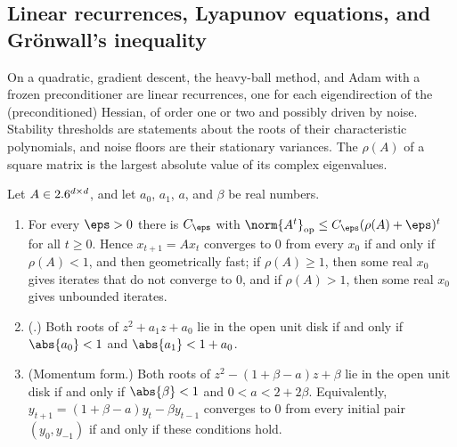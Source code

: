 \begin{refsection}
\section{Linear recurrences, Lyapunov equations, and Gr\"onwall's inequality}\label{sec:toolkit:recurrences}

On a quadratic, gradient descent, the heavy-ball method, and Adam with a frozen preconditioner are linear recurrences, one for each eigendirection of the (preconditioned) Hessian, of order one or two and possibly driven by noise. Stability thresholds are statements about the roots of their characteristic polynomials, and noise floors are their stationary variances. The  $\rho(A)$ of a square matrix is the largest absolute value of its complex eigenvalues.

\begin{lemma}\label{lem:toolkit:recurrence}
Let $A\in2.6^{d\times d}$, and let $a_0$, $a_1$, $a$, and $\beta$ be real numbers.
\begin{enumerate}
\item For every $\eps>0$ there is $C_\eps$ with $\norm{A^t}_{\op}\le C_\eps(\rho(A)+\eps)^t$ for all $t\ge0$. Hence $x_{t+1}=Ax_t$ converges to $0$ from every $x_0$ if and only if $\rho(A)<1$, and then geometrically fast; if $\rho(A)\ge1$, then some real $x_0$ gives iterates that do not converge to $0$, and if $\rho(A)>1$, then some real $x_0$ gives unbounded iterates.
\item (.) Both roots of $z^2+a_1z+a_0$ lie in the open unit disk if and only if $\abs{a_0}<1$ and $\abs{a_1}<1+a_0$.
\item (Momentum form.) Both roots of $z^2-(1+\beta-a)z+\beta$ lie in the open unit disk if and only if $\abs{\beta}<1$ and $0<a<2+2\beta$. Equivalently, $y_{t+1}=(1+\beta-a)y_t-\beta y_{t-1}$ converges to $0$ from every initial pair $(y_0,y_{-1})$ if and only if these conditions hold.
\end{enumerate}
\end{lemma}


\end{refsection}

